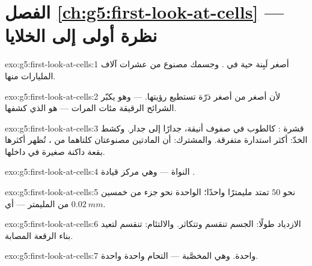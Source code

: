 \section*{الفصل \ref{ch:g5:first-look-at-cells} --- نظرة أولى إلى الخلايا}

\begin{solution}{exo:g5:first-look-at-cells:1}
أصغر لَبِنة حية في . وجسمك مصنوع من عشرات آلاف
المليارات منها.
\end{solution}

\begin{solution}{exo:g5:first-look-at-cells:2}
لأن  أصغر من أصغر ذرّة تستطيع  رؤيتها.  ---
وهو يكبّر الشرائح الرقيقة مئات المرات --- هو الذي كشفها.
\end{solution}

\begin{solution}{exo:g5:first-look-at-cells:3}
قشرة :  كالطوب في صفوف أنيقة، جدارًا إلى جدار. وكشط
الخدّ:  أكثر استدارة متفرقة. والمشترك: أن المادتين مصنوعتان
كلتاهما من ، تُظهر أكثرها بقعة داكنة صغيرة في داخلها.
\end{solution}

\begin{solution}{exo:g5:first-look-at-cells:4}
النواة --- وهي مركز قيادة .
\end{solution}

\begin{solution}{exo:g5:first-look-at-cells:5}
نحو $50$  تمتد مليمترًا واحدًا؛  الواحدة نحو جزء من
خمسين من المليمتر --- أي $\qty{0.02}{mm}$.
\end{solution}

\begin{solution}{exo:g5:first-look-at-cells:6}
الازدياد طولًا:  الجسم تنقسم وتتكاثر. والالتئام:  تنقسم
لتعيد بناء الرقعة المصابة.
\end{solution}

\begin{solution}{exo:g5:first-look-at-cells:7}
واحدة. وهي  المخصَّبة --- التحام  واحدة  واحدة.
\end{solution}

